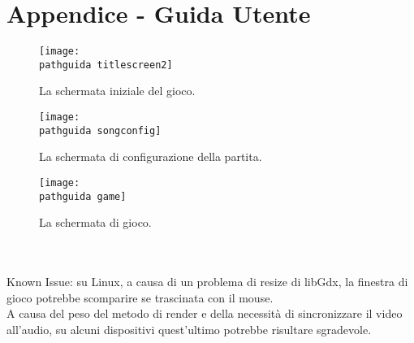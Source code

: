 \documentclass[a4paper,12pt]{report}
\newcommand\pathguida{img/guidautente/}
\begin{document}
\chapter{Appendice - Guida Utente}
\begin{figure}[!htb]
	\centerline{\texttt{[image: \\pathguida titlescreen2]}}
	\caption{La schermata iniziale del gioco.}
	\label{img:title}
\end{figure}
\clearpage \hfill\break
\begin{figure}[!htb]
	\centerline{\texttt{[image: \\pathguida songconfig]}}
	\caption{La schermata di configurazione della partita.}
	\label{img:select}
\end{figure}
\clearpage \hfill\break
\begin{figure}[!htb]
	\centerline{\texttt{[image: \\pathguida game]}}
	\caption{La schermata di gioco.}
	\label{img:game}
\end{figure} \\ \\
Known Issue: su Linux, a causa di un problema di resize di libGdx, la finestra di gioco potrebbe scomparire se trascinata con il mouse. \\ A causa del peso del metodo di render e della necessità di sincronizzare il video all'audio, su alcuni dispositivi quest'ultimo potrebbe risultare sgradevole.
\end{document}
